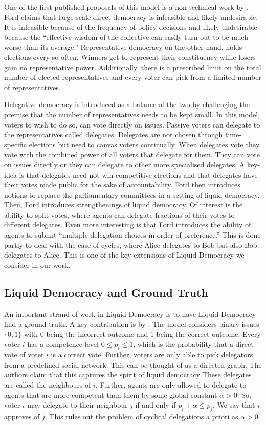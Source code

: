 \documentclass[11pt,a4paper, titlepage]{article}
\theoremstyle{definition}
\begin{document}
One of the first published proposals of this model is a non-technical work by \cite{ford2002delegative}. 
Ford claims that large-scale direct democracy is infeasible and likely undesirable.
It is infeasible because of the frequency of policy decisions and likely undesirable because the ``effective wisdom of the collective can easily turn out to be much worse than its average.''
Representative democracy on the other hand, holds elections every so often. Winners get to represent their constituency while losers gain no representative power.
Additionally, there is a prescribed limit on the total number of elected representatives and every voter can pick from a limited number of representatives.

Delegative democracy is introduced as a balance of the two by challenging the premise that the number of representatives needs to be kept small.
In this model, voters to wish to do so, can vote directly on issues.
Passive voters can delegate to the representatives called delegates.
Delegates are not chosen through time-specific elections but need to canvas voters continually.
When delegates vote they vote with the combined power of all voters that delegate for them.
They can vote on issues directly or they can delegate to other more specialised delegates.
A key-idea is that delegates need not win competitive elections and that delegates have their votes made public for the sake of accountability. 
Ford then introduces notions to replace the parliamentary committees in a setting of liquid democracy.
Then, Ford introduces strengthenings of liquid democracy.
Of interest is the ability to split votes, where agents can delegate fractions of their votes to different delegates. 
Even more interesting is that Ford introduces the ability of agents to submit ``multiple delegation choices in order of preference.'' This is done partly to deal with the case of cycles, where Alice delegates to Bob but also Bob delegates to Alice.
This is one of the key extensions of Liquid Democracy we consider in our work.

\subsection{Liquid Democracy and Ground Truth}
An important strand of work in Liquid Democracy is to have Liquid Democracy find a ground truth. 
A key contribution is by \citet{kahng2021liquid}. 
The model considers binary issues $\{0, 1\}$ with $0$ being the incorrect outcome and $1$ being the correct outcome. Every voter $i$ has a competence level $0 \leq p_i \leq 1$, which is the probability that a direct vote of voter $i$ is a correct vote.
Further, voters are only able to pick delegators from a predefined social network. This can be thought of as a directed graph. 
The authors claim that this captures the spirit of liquid democracy 
These delegates are called the neighbours of $i$.
Further, agents are only allowed to delegate to agents that are more competent than them by some global constant $\alpha >0$.
So, voter $i$ may delegate to their neighbour $j$ if and only if $p_i + \alpha \leq p_j$. 
We say that $i$ approves of $j$.
This rules out the problem of cyclical delegations a priori as $\alpha > 0$.
\end{document}
